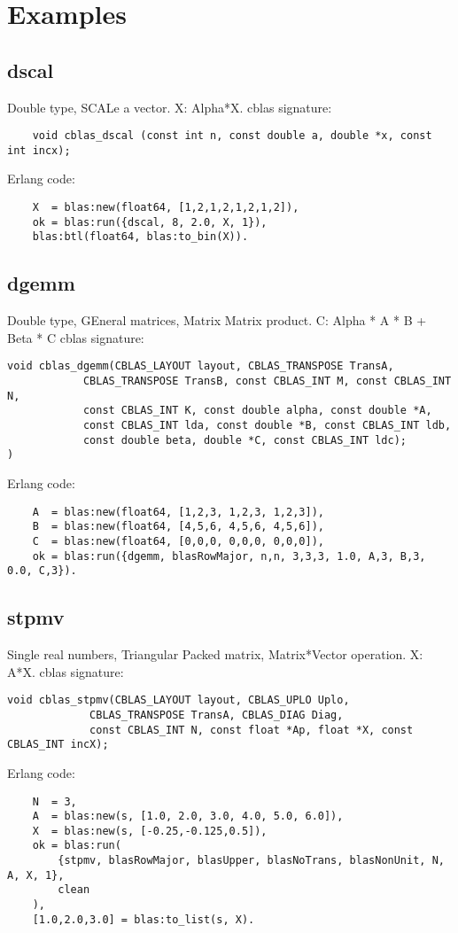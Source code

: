 \documentclass{article}
\begin{document}
\section{Examples}
\subsection{dscal}
Double type, SCALe a vector.\newline
X: Alpha*X.\newline
cblas signature:
\begin{verbatim}
    void cblas_dscal (const int n, const double a, double *x, const int incx);
\end{verbatim}
Erlang code:
\begin{verbatim}
    X  = blas:new(float64, [1,2,1,2,1,2,1,2]),
    ok = blas:run({dscal, 8, 2.0, X, 1}),
    blas:btl(float64, blas:to_bin(X)).
\end{verbatim}

\subsection{dgemm}
Double type, GEneral matrices, Matrix Matrix product.\newline
C: Alpha * A * B + Beta * C\newline
cblas signature:
\begin{verbatim}
void cblas_dgemm(CBLAS_LAYOUT layout, CBLAS_TRANSPOSE TransA,
            CBLAS_TRANSPOSE TransB, const CBLAS_INT M, const CBLAS_INT N,
            const CBLAS_INT K, const double alpha, const double *A,
            const CBLAS_INT lda, const double *B, const CBLAS_INT ldb,
            const double beta, double *C, const CBLAS_INT ldc);
)	
\end{verbatim}

Erlang code:
\begin{verbatim}
    A  = blas:new(float64, [1,2,3, 1,2,3, 1,2,3]),
    B  = blas:new(float64, [4,5,6, 4,5,6, 4,5,6]),
    C  = blas:new(float64, [0,0,0, 0,0,0, 0,0,0]),
    ok = blas:run({dgemm, blasRowMajor, n,n, 3,3,3, 1.0, A,3, B,3, 0.0, C,3}). 
\end{verbatim}

\subsection{stpmv}
Single real numbers, Triangular Packed matrix, Matrix*Vector operation.\newline
X: A*X.\newline
cblas signature:
\begin{verbatim}
void cblas_stpmv(CBLAS_LAYOUT layout, CBLAS_UPLO Uplo,
             CBLAS_TRANSPOSE TransA, CBLAS_DIAG Diag,
             const CBLAS_INT N, const float *Ap, float *X, const CBLAS_INT incX);
\end{verbatim}
Erlang code:
\begin{verbatim}
    N  = 3,
    A  = blas:new(s, [1.0, 2.0, 3.0, 4.0, 5.0, 6.0]),
    X  = blas:new(s, [-0.25,-0.125,0.5]),
    ok = blas:run(
        {stpmv, blasRowMajor, blasUpper, blasNoTrans, blasNonUnit, N, A, X, 1},
        clean
    ),
    [1.0,2.0,3.0] = blas:to_list(s, X).
\end{verbatim}
\end{document}
